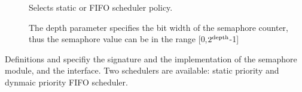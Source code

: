 \documentclass[a4paper,12pt,twoside,english]{article}
\begin{document}
\begin{description}
\item[] $ $\\
Selects static or FIFO scheduler policy.

\item[] $ $\\
The depth parameter specifies the bit width of the semaphore counter, thus the semaphore value can be in the range {[}0,$\rm{2}^{depth}$-1{]}


\end{description}
Definitions  and  specifiy the signature and the implementation of the semaphore module, and   the interface.
Two schedulers are available: static priority and dynmaic priority FIFO scheduler.
\end{document}
